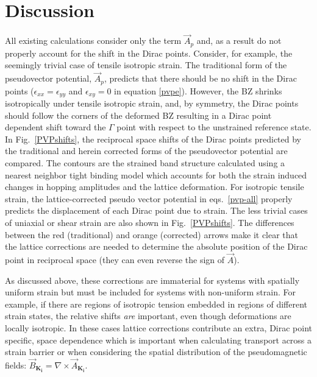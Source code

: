 \section{Discussion}

All existing calculations consider only the term $\vec{A}_p$ and, as a result do not properly account for the shift in the Dirac points.
Consider, for example, the seemingly trivial case of tensile isotropic strain.
The traditional form of the pseudovector potential, $\vec{A}_p$, predicts that there should be no shift in the Dirac points ($\epsilon_{xx}=\epsilon_{yy}$ and $\epsilon_{xy}=0$ in equation \ref{pvpe}).
However, the BZ shrinks isotropically under tensile isotropic strain, and, by symmetry, the Dirac points should follow the corners of the deformed BZ resulting in a Dirac point dependent shift toward the $\Gamma$ point with respect to the unstrained reference state.
In Fig.~\ref{PVPshifts}, the reciprocal space shifts of the Dirac points predicted by the traditional and herein corrected forms of the pseudovector potential are compared.
The contours are the strained band structure calculated using a nearest neighbor tight binding model which accounts for both the strain induced changes in hopping amplitudes and the lattice deformation\cite{Pereira2009}.
For isotropic tensile strain, the lattice-corrected pseudo vector potential in eqs.~\eqref{pvp-all} properly predicts the displacement of each Dirac point due to strain.
The less trivial cases of uniaxial or shear strain are also shown in Fig.~\ref{PVPshifts}. The differences between the red (traditional) and orange (corrected) arrows make it clear that the lattice corrections are needed to determine the absolute position of the Dirac point in reciprocal space (they can even reverse the sign of $\vec{A}$).

As discussed above, these corrections are immaterial for systems with spatially uniform strain but must be included for systems with non-uniform strain.
For example, if there are regions of isotropic tension embedded in regions of different strain states, the relative shifts \emph{are} important, even though deformations are locally isotropic.
In these cases lattice corrections contribute an extra, Dirac point specific, space dependence which is important when calculating transport across a strain barrier or when considering the spatial distribution of the pseudomagnetic fields: $\vec{B}_{\bm{K_i}} = \nabla \times \vec{A}_{\bm{K_i}}$.

